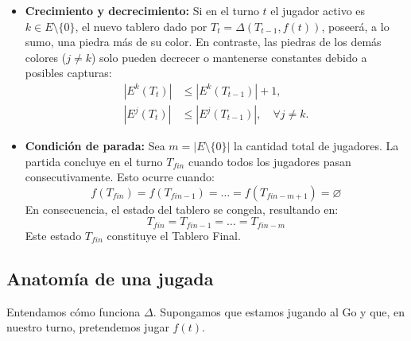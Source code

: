 \begin{itemize}
	\item \textbf{Crecimiento y decrecimiento:} Si en el turno $t$ el jugador activo es $k \in E \setminus \{0\}$, el nuevo tablero dado por $T_t = \Delta(T_{t-1}, f(t))$, poseerá, a lo sumo, una piedra más de su color. En contraste, las piedras de los demás colores ($j \neq k$) solo pueden decrecer o mantenerse constantes debido a posibles capturas:
	\begin{align*}
		|E^k(T_t)| &\le |E^k(T_{t-1})| + 1,\\
		|E^j(T_t)| &\le |E^j(T_{t-1})|, \quad \forall j \neq k.
	\end{align*}
	
	
	\item \textbf{Condición de parada:} Sea $m = |E \setminus \{0\}|$ la cantidad total de jugadores. La partida concluye en el turno $T_{fin}$ cuando todos los jugadores pasan consecutivamente. Esto ocurre cuando:
	$$f(T_{fin}) = f(T_{fin-1}) = \dots = f(T_{fin-m+1}) = \varnothing$$
	En consecuencia, el estado del tablero se congela, resultando en:
	$$T_{{fin}} = T_{{fin-1}} = \dots = T_{{fin-m}}$$
	Este estado $T_{{fin}}$ constituye el Tablero Final.
\end{itemize}

\subsection{Anatomía de una jugada}
Entendamos cómo funciona $\Delta$. Supongamos que estamos jugando al Go y que, en nuestro turno, pretendemos jugar $f(t)$.

